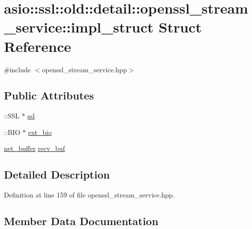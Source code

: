 \hypertarget{structasio_1_1ssl_1_1old_1_1detail_1_1openssl__stream__service_1_1impl__struct}{}\section{asio\+:\+:ssl\+:\+:old\+:\+:detail\+:\+:openssl\+\_\+stream\+\_\+service\+:\+:impl\+\_\+struct Struct Reference}
\label{structasio_1_1ssl_1_1old_1_1detail_1_1openssl__stream__service_1_1impl__struct}


{\ttfamily \#include $<$openssl\+\_\+stream\+\_\+service.\+hpp$>$}

\subsection*{Public Attributes}
\begin{DoxyCompactItemize}
\item 
\+::S\+S\+L $\ast$ \hyperlink{structasio_1_1ssl_1_1old_1_1detail_1_1openssl__stream__service_1_1impl__struct_ad80b27797dc8f5aa013dc54add0153f7}{ssl}
\item 
\+::B\+I\+O $\ast$ \hyperlink{structasio_1_1ssl_1_1old_1_1detail_1_1openssl__stream__service_1_1impl__struct_a46c549183817ecbcab44247ee813c21b}{ext\+\_\+bio}
\item 
\hyperlink{classasio_1_1ssl_1_1old_1_1detail_1_1net__buffer}{net\+\_\+buffer} \hyperlink{structasio_1_1ssl_1_1old_1_1detail_1_1openssl__stream__service_1_1impl__struct_aa23375c5983d48ca327f4052537e39f8}{recv\+\_\+buf}
\end{DoxyCompactItemize}


\subsection{Detailed Description}


Definition at line 159 of file openssl\+\_\+stream\+\_\+service.\+hpp.



\subsection{Member Data Documentation}
\hypertarget{structasio_1_1ssl_1_1old_1_1detail_1_1openssl__stream__service_1_1impl__struct_a46c549183817ecbcab44247ee813c21b}{}
